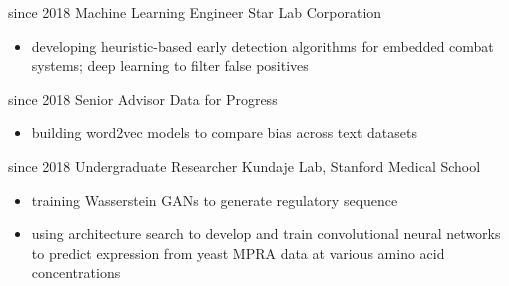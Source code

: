 \documentclass[]{resume}
\begin{document}
\begin{multicols}{2}
\begin{entrylist}
  \entry
    {since 2018}
    {Machine Learning Engineer}
    {Star Lab Corporation}
    {
     \begin{itemize}[leftmargin=*]
          \item developing heuristic-based early detection algorithms for embedded combat systems; deep learning to filter false positives
     \end{itemize}}
     
  \entry
    {since 2018}
    {Senior Advisor}
    {Data for Progress}
    {
     \begin{itemize}[leftmargin=*]
          \item building word2vec models to compare bias across text datasets
     \end{itemize}}

  \entry
    {since 2018}
    {Undergraduate Researcher}
    {Kundaje Lab, Stanford Medical School}
    {
     \begin{itemize}[leftmargin=*]
          \item training Wasserstein GANs to generate regulatory sequence
	      \item using architecture search to develop and train convolutional neural networks to predict expression from yeast MPRA data at various amino acid concentrations 
     \end{itemize}}



\end{entrylist}
\end{multicols}
\end{document}
